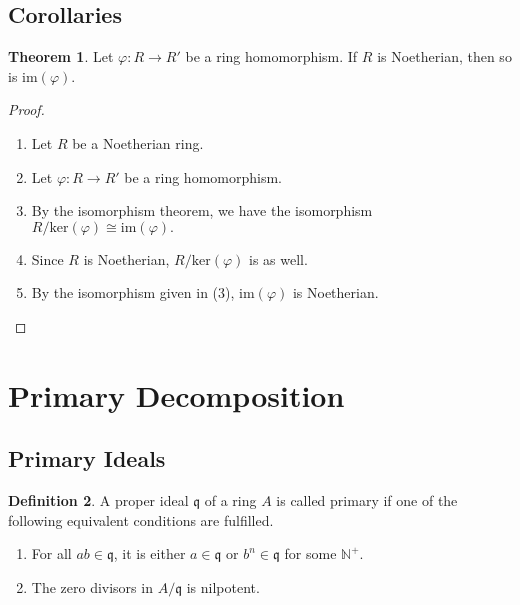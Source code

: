 \documentclass[a4paper]{book}
\theoremstyle{definition}
\newtheorem{definition}{Definition}[]
\newtheorem{theorem}[definition]{Theorem}
\begin{document}
\newpage
\subsection{Corollaries}
\begin{thmbox}
    \begin{theorem}
        Let \(\varphi: R \longrightarrow R'\) be a ring homomorphism. If \(R\) is Noetherian, then so is \(\text{im}(\varphi)\).
    \end{theorem}
\end{thmbox}
\begin{proof}
    \begin{enumerate}
        \item Let \(R\) be a Noetherian ring.
        \item Let \(\varphi: R \longrightarrow R'\) be a ring homomorphism.
        \item By the isomorphism theorem, we have the isomorphism \(R / \text{ker}(\varphi) \cong \text{im}(\varphi).\)
        \item Since \(R\) is Noetherian, \(R / \text{ker}(\varphi)\) is as well.
        \item By the isomorphism given in (3), \(\text{im}(\varphi)\) is Noetherian.
    \end{enumerate}
\end{proof}





\newpage
\section{Primary Decomposition}
\subsection{Primary Ideals}
\begin{defbox}
    \begin{definition}
        A proper ideal \(\mathfrak{q}\) of a ring \(A\) is called primary if one of the following equivalent conditions are fulfilled.
        \begin{enumerate}
            \item For all \(ab \in \mathfrak{q}\), it is either \(a \in \mathfrak{q}\) or \(b^n \in \mathfrak{q}\) for some \(\mathbb{N}^+\).
            \item The zero divisors in \(A / \mathfrak{q}\) is nilpotent.
        \end{enumerate}
    \end{definition}
\end{defbox}
\end{document}

